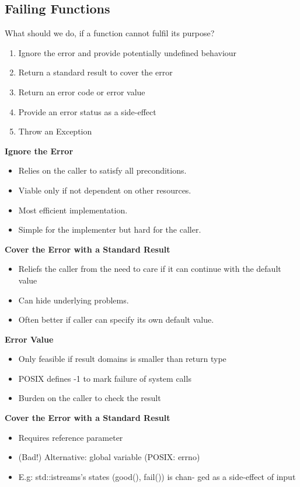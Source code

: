 \subsection{Failing Functions}
What should we do, if a function cannot fulfil its purpose?
\begin{enumerate}
  \itemsep -0.5em 
  \item Ignore the error and provide potentially undefined behaviour
  \item Return a standard result to cover the error
  \item Return an error code or error value
  \item Provide an error status as a side-effect
  \item Throw an Exception
\end{enumerate}

\begin{minipage}{0,5\linewidth}
	\textbf{Ignore the Error}
		\begin{itemize}
  			\itemsep -0.5em 
  			\item Relies on the caller to satisfy all preconditions.
  			\item Viable only if not dependent on other resources.
  				\item Most efficient implementation.
  		\item Simple for the implementer but hard for the caller.
		\end{itemize}
	\textbf{Cover the Error with a Standard Result}
		\begin{itemize}
  			\itemsep -0.5em 
  			\item Reliefs the caller from the need to care if it can continue with the default value
  			\item Can hide underlying problems.
  			\item Often better if caller can specify its own default value.
		\end{itemize}
\end{minipage}
\begin{minipage}{0,5\linewidth}
  	\textbf{Error Value} 
  		\begin{itemize}
 			\itemsep -0.5em 
  			\item Only feasible if result domains is smaller than return type
  			\item POSIX defines -1 to mark failure of system calls
  			\item Burden on the caller to check the result
		\end{itemize}
	\textbf{Cover the Error with a Standard Result}  
		\begin{itemize}
  			\itemsep -0.5em
  			\item Requires reference parameter
  			\item (Bad!) Alternative: global variable (POSIX: errno)
  			\item E.g: std::istreams’s states (good(), fail()) is chan- ged as a side-effect of input
		\end{itemize}
\end{minipage}

